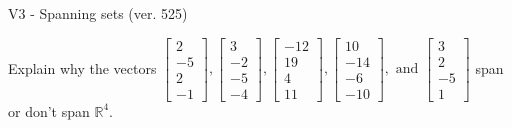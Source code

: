 \begin{exercise}
  \begin{exerciseTitle}V3 - Spanning sets (ver. 525)\end{exerciseTitle}
  \begin{exerciseStatement}
    Explain why the vectors \(\left[\begin{array}{r}
2 \\
-5 \\
2 \\
-1
\end{array}\right] , \left[\begin{array}{r}
3 \\
-2 \\
-5 \\
-4
\end{array}\right] , \left[\begin{array}{r}
-12 \\
19 \\
4 \\
11
\end{array}\right] , \left[\begin{array}{r}
10 \\
-14 \\
-6 \\
-10
\end{array}\right] , \text{ and } \left[\begin{array}{r}
3 \\
2 \\
-5 \\
1
\end{array}\right]\) span or don't span \(\mathbb{R}^4\). 
	



\end{exerciseStatement}
\end{exercise}
